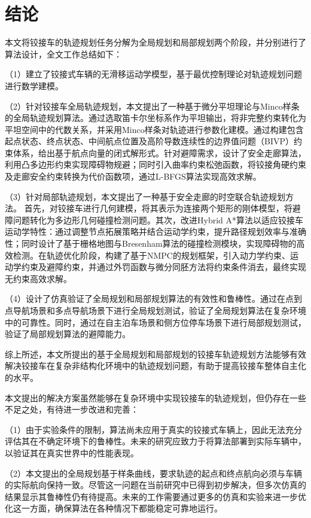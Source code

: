 \documentclass[master,academic]{ysuthesis} %
\begin{document}
	\chapter{结论}
	本文将铰接车的轨迹规划任务分解为全局规划和局部规划两个阶段，并分别进行了算法设计，全文工作总结如下：

	（1）建立了铰接式车辆的无滑移运动学模型，基于最优控制理论对轨迹规划问题进行数学建模。

	（2）针对铰接车全局轨迹规划，本文提出了一种基于微分平坦理论与Minco样条的全局轨迹规划算法。通过选取笛卡尔坐标系作为平坦输出，将非完整约束转化为平坦空间中的代数关系，并采用Minco样条对轨迹进行参数化建模。通过构建包含起点状态、终点状态、中间航点位置及高阶导数连续性的边界值问题（BIVP）约束体系，给出基于航点向量的闭式解形式。针对避障需求，设计了安全走廊算法，利用凸多边形约束实现障碍物规避；同时引入曲率约束松弛函数，将铰接角硬约束及走廊安全约束转换为代价函数项，通过L-BFGS算法实现高效求解。

	（3）针对局部轨迹规划，本文提出了一种基于安全走廊的时空联合轨迹规划方法。 首先，对铰接车进行几何建模，将其表示为连接两个矩形的刚体模型，将避障问题转化为多边形几何碰撞检测问题。其次，改进Hybrid A*算法以适应铰接车运动学特性：通过调整节点拓展策略并结合运动学约束，提升路径规划效率与准确性；同时设计了基于栅格地图与Bresenham算法的碰撞检测模块，实现障碍物的高效检测。在轨迹优化阶段，构建了基于NMPC的规划框架，引入动力学约束、运动学约束及避障约束，并通过外罚函数与微分同胚方法将约束条件消去，最终实现无约束高效求解。

	（4）设计了仿真验证了全局规划和局部规划算法的有效性和鲁棒性。通过在点到点导航场景和多点导航场景下进行全局规划测试，验证了全局规划算法在复杂环境中的可靠性。同时，通过在自主泊车场景和侧方位停车场景下进行局部规划测试，验证了局部规划算法的避障能力。

	综上所述，本文所提出的基于全局规划和局部规划的铰接车轨迹规划方法能够有效解决铰接车在复杂非结构化环境中的轨迹规划问题，有助于提高铰接车整体自主化的水平。

	本文提出的解决方案虽然能够在复杂环境中实现铰接车的轨迹规划，但仍存在一些不足之处，有待进一步改进和完善：

	（1）由于实验条件的限制，算法尚未应用于真实的铰接式车辆上，因此无法充分评估其在不确定环境下的鲁棒性。未来的研究应致力于将算法部署到实际车辆中，以验证其在真实世界中的性能表现。

	（2）本文提出的全局规划基于样条曲线，要求轨迹的起点和终点航向必须与车辆的实际航向保持一致。尽管这一问题在当前研究中已得到初步解决，但多次仿真的结果显示其鲁棒性仍有待提高。未来的工作需要通过更多的仿真和实验来进一步优化这一方面，确保算法在各种情况下都能稳定可靠地运行。
\end{document}
